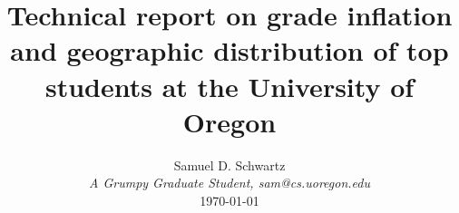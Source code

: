 \documentclass[10pt]{article}
\begin{document}
\title{Technical report on grade inflation and geographic distribution of top students at the University of Oregon
}


\author{Samuel D. Schwartz\\ \small \textit{A Grumpy Graduate Student, sam@cs.uoregon.edu} \\
		\small \today
}
\date{}

\maketitle
\end{document}
